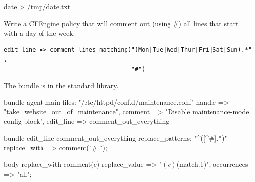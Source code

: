 




\begin{aside}
\label{aside:exercise_30}

\begin{code}
date  > /tmp/date.txt
\end{code}

Write a CFEngine policy that will comment out (using \#)
all lines that start with a day of the week:

\begin{verbatim}
edit_line => comment_lines_matching("(Mon|Tue|Wed|Thur|Fri|Sat|Sun).*" ,
                                    "#")
\end{verbatim}

The  bundle  is in the standard
library.

\end{aside}
\begin{codelisting}
\begin{code}
bundle agent main
{
  files:
      "/etc/httpd/conf.d/maintenance.conf"
        handle    => "take_website_out_of_maintenance",
        comment   => "Disable maintenance-mode config block",
        edit_line => comment_out_everything;
}

bundle edit_line comment_out_everything
{
  replace_patterns:
      "^([^#].*)"
        replace_with => comment("# ");
}

body replace_with comment(c)
{
        replace_value => "$(c) $(match.1)";
        occurrences => "all";
}


\end{code}
\end{codelisting}
\begin{codelisting}
\end{codelisting}
